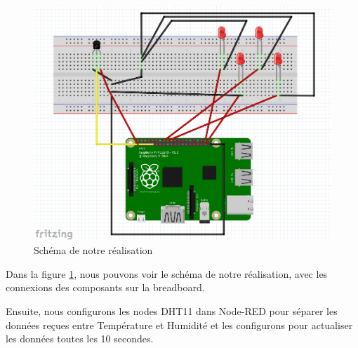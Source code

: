 \begin{figure}[H]
\centering
\includegraphics[width=15cm]{Images/RaspberryVisual.png}
\caption{Schéma de notre réalisation}
\label{Chap4.3.13}
\end{figure}

Dans la figure \ref{Chap4.3.13}, nous pouvons voir le schéma de notre réalisation, avec les connexions des composants sur la breadboard.

Ensuite, nous configurons les nodes DHT11 dans Node-RED pour séparer les données reçues entre Température et Humidité et les configurons pour actualiser les données toutes les 10 secondes.

